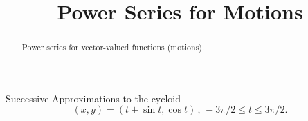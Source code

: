 \documentclass{ximera}
\title{Power Series for Motions}
\begin{document}
\begin{abstract}
Power series for vector-valued functions (motions).
\end{abstract}
\maketitle

\begin{exploration}
Successive Approximations to the cycloid
\[
    (x,y) = (t +\sin t, \cos t) \, , \, -3\pi/2 \leq t \leq 3\pi/2 .
\]


 
\begin{onlineOnly}
    \begin{center}
\end{center}
\end{onlineOnly}
\end{exploration}
\end{document}
